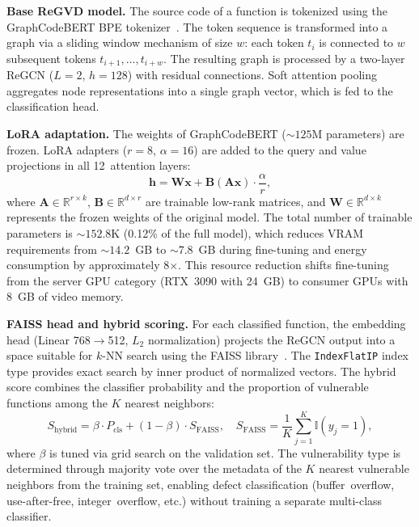 \documentclass[runningheads]{llncs}
\begin{document}
\textbf{Base ReGVD model.} The source code of a function is tokenized using the GraphCodeBERT BPE tokenizer~\cite{guo2021graphcodebert}. The token sequence is transformed into a graph via a sliding window mechanism of size $w$: each token $t_i$ is connected to $w$ subsequent tokens $t_{i+1}, \ldots, t_{i+w}$. The resulting graph is processed by a two-layer ReGCN ($L{=}2$, $h{=}128$) with residual connections. Soft attention pooling aggregates node representations into a single graph vector, which is fed to the classification head.

\textbf{LoRA adaptation.} The weights of GraphCodeBERT (${\sim}125$M parameters) are frozen. LoRA adapters ($r = 8$, $\alpha = 16$) are added to the query and value projections in all 12~attention layers:
\begin{equation}
    \mathbf{h} = \mathbf{W}\mathbf{x} + \mathbf{B}(\mathbf{A}\mathbf{x}) \cdot \frac{\alpha}{r},
    \label{eq:lora}
\end{equation}
where $\mathbf{A} \in \mathbb{R}^{r \times k}$, $\mathbf{B} \in \mathbb{R}^{d \times r}$ are trainable low-rank matrices, and $\mathbf{W} \in \mathbb{R}^{d \times k}$ represents the frozen weights of the original model. The total number of trainable parameters is ${\sim}152.8$K (0.12\% of the full model), which reduces VRAM requirements from ${\sim}14.2$~GB to ${\sim}7.8$~GB during fine-tuning and energy consumption by approximately 8$\times$. This resource reduction shifts fine-tuning from the server GPU category (RTX~3090 with 24~GB) to consumer GPUs with 8~GB of video memory.

\textbf{FAISS head and hybrid scoring.} For each classified function, the embedding head (Linear 768$\to$512, $L_2$ normalization) projects the ReGCN output into a space suitable for $k$-NN search using the FAISS library~\cite{johnson2019faiss}. The \texttt{IndexFlatIP} index type provides exact search by inner product of normalized vectors. The hybrid score combines the classifier probability and the proportion of vulnerable functions among the $K$ nearest neighbors:
\begin{equation}
    S_{\text{hybrid}} = \beta \cdot P_{\text{cls}} + (1 - \beta) \cdot S_{\text{FAISS}}, \quad S_{\text{FAISS}} = \frac{1}{K}\sum_{j=1}^{K} \mathbb{I}(y_j = 1),
    \label{eq:hybrid}
\end{equation}
where $\beta$ is tuned via grid search on the validation set. The vulnerability type is determined through majority vote over the metadata of the $K$ nearest vulnerable neighbors from the training set, enabling defect classification (buffer~overflow, use-after-free, integer~overflow, etc.) without training a separate multi-class classifier.
\end{document}
